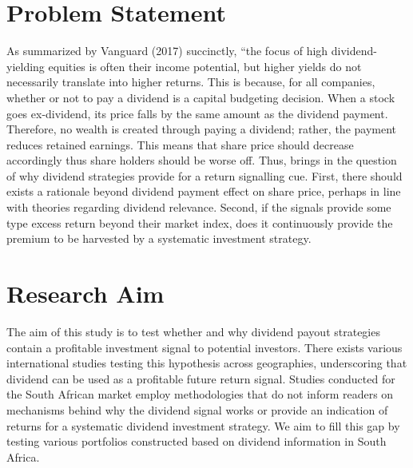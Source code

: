 \documentclass[12pt,preprint, authoryear]{elsarticle}
\numberwithin{equation}{section}
\numberwithin{figure}{section}
\numberwithin{table}{section}
\begin{document}

\headsep 35pt %




\hypertarget{problem-statement}{%
\section{Problem Statement}\label{problem-statement}}

As summarized by Vanguard (2017) succinctly, ``the focus of high
dividend-yielding equities is often their income potential, but higher
yields do not necessarily translate into higher returns. This is
because, for all companies, whether or not to pay a dividend is a
capital budgeting decision. When a stock goes ex-dividend, its price
falls by the same amount as the dividend payment. Therefore, no wealth
is created through paying a dividend; rather, the payment reduces
retained earnings. This means that share price should decrease
accordingly thus share holders should be worse off. Thus, brings in the
question of why dividend strategies provide for a return signalling cue.
First, there should exists a rationale beyond dividend payment effect on
share price, perhaps in line with theories regarding dividend relevance.
Second, if the signals provide some type excess return beyond their
market index, does it continuously provide the premium to be harvested
by a systematic investment strategy.

\hypertarget{research-aim}{%
\section{Research Aim}\label{research-aim}}

The aim of this study is to test whether and why dividend payout
strategies contain a profitable investment signal to potential
investors. There exists various international studies testing this
hypothesis across geographies, underscoring that dividend can be used as
a profitable future return signal. Studies conducted for the South
African market employ methodologies that do not inform readers on
mechanisms behind why the dividend signal works or provide an indication
of returns for a systematic dividend investment strategy. We aim to fill
this gap by testing various portfolios constructed based on dividend
information in South Africa.

\newpage
\end{document}
